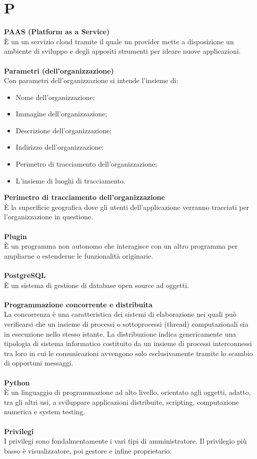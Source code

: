 \section{P}
\textbf{PAAS (Platform as a Service)}\\
È un un servizio cloud tramite il quale un provider mette a disposizione un ambiente di sviluppo e degli appositi strumenti per ideare nuove applicazioni. \\ \\
\textbf{Parametri (dell'organizzazione)}\\
Con parametri dell'organizzazione si intende l'insieme di:
\begin{itemize}
    \item Nome dell'organizzazione;
    \item Immagine dell'organizzazione;
    \item Descrizione dell'organizzazione;
    \item Indirizzo dell'organizzazione;
    \item Perimetro di tracciamento dell'organizzazione;
    \item L'insieme di luoghi di tracciamento.\\
\end{itemize} 

\textbf{Perimetro di tracciamento dell'organizzazione}\\
È la superificie geografica dove gli utenti dell'applicazione verranno tracciati per l'organizzazione in questione.\\ \\
\textbf{Plugin}\\
È un programma non autonomo che interagisce con un altro programma per ampliarne o estenderne le funzionalità originarie. \\ \\
\textbf{PostgreSQL}\\
È un sistema di gestione di database open source ad oggetti. \\ \\
\textbf{Programmazione concorrente e distribuita}\\
La concorrenza è una caratteristica dei sistemi di elaborazione nei quali può verificarsi che un insieme di processi o sottoprocessi (thread) computazionali sia in esecuzione nello stesso istante. La distribuzione indica genericamente una tipologia di sistema informatico costituito da un insieme di processi interconnessi tra loro in cui le comunicazioni avvengono solo esclusivamente tramite lo scambio di opportuni messaggi. \\ \\
\textbf{Python}\\
È un linguaggio di programmazione ad alto livello, orientato agli oggetti, adatto, tra gli altri usi, a sviluppare applicazioni distribuite, scripting, computazione numerica e system testing. \\ \\
\textbf{Privilegi}\\
I privilegi sono fondalmentamente i vari tipi di amministratore. Il privilegio più basso è visualizzatore, poi gestore e infine proprietario. \\ \\
\clearpage